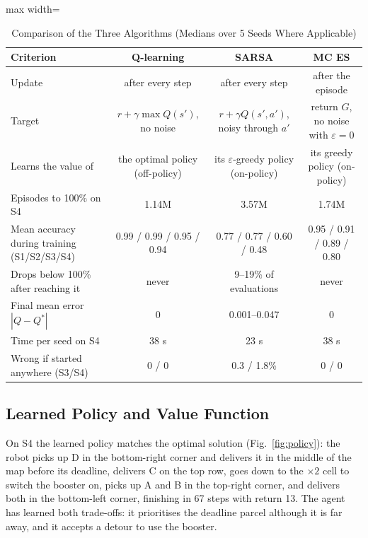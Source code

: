 \documentclass[conference]{IEEEtran}
\newcommand{\Qs}{Q^{*}}
\newcommand{\eps}{\varepsilon}
\begin{document}
\begin{table}[!t]
\caption{Comparison of the Three Algorithms (Medians over 5 Seeds Where Applicable)}
\label{tab:compare}
\centering
\footnotesize
\begin{adjustbox}{max width=\textwidth}
\begin{tabular}{|l|c|c|c|}
\hline
\textbf{Criterion} & \textbf{Q-learning} & \textbf{SARSA} & \textbf{MC ES} \\
\hline
Update & after every step & after every step & after the episode \\
Target & $r+\gamma\max Q(s')$, no noise & $r+\gamma Q(s',a')$, noisy through $a'$ & return $G$, no noise with $\eps=0$ \\
Learns the value of & the optimal policy (off-policy) & its $\eps$-greedy policy (on-policy) & its greedy policy (on-policy) \\
Episodes to 100\% on S4 & 1.14M & 3.57M & 1.74M \\
Mean accuracy during training (S1/S2/S3/S4) & 0.99 / 0.99 / 0.95 / 0.94 & 0.77 / 0.77 / 0.60 / 0.48 & 0.95 / 0.91 / 0.89 / 0.80 \\
Drops below 100\% after reaching it & never & 9--19\% of evaluations & never \\
Final mean error $|Q-\Qs|$ & 0 & 0.001--0.047 & 0 \\
Time per seed on S4 & 38 s & 23 s & 38 s \\
Wrong if started anywhere (S3/S4) & 0 / 0 & 0.3 / 1.8\% & 0 / 0 \\
\hline
\end{tabular}
\end{adjustbox}
\end{table}

\subsection{Learned Policy and Value Function}
On S4 the learned policy matches the optimal solution (Fig.~\ref{fig:policy}): the robot picks up D in the bottom-right corner and delivers it in the middle of the map before its deadline, delivers C on the top row, goes down to the $\times2$ cell to switch the booster on, picks up A and B in the top-right corner, and delivers both in the bottom-left corner, finishing in 67 steps with return 13. The agent has learned both trade-offs: it prioritises the deadline parcel although it is far away, and it accepts a detour to use the booster.
\end{document}
